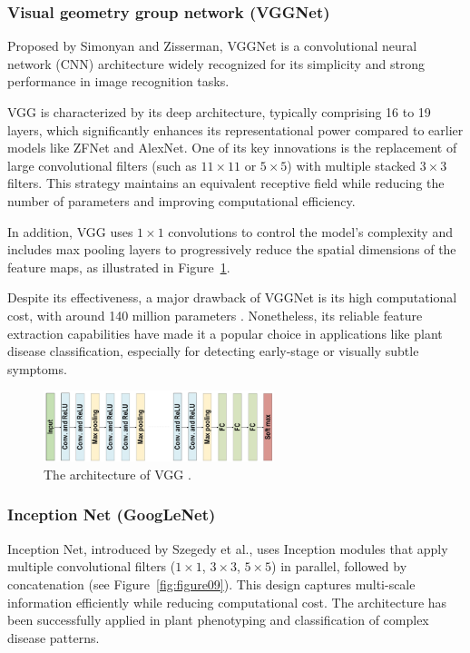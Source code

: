 \subsubsection{Visual geometry group network (VGGNet)}
Proposed by Simonyan and Zisserman, VGGNet is a convolutional neural network (CNN) architecture widely recognized for its simplicity and strong performance in image recognition tasks.

VGG is characterized by its deep architecture, typically comprising 16 to 19 layers, which significantly enhances its representational power compared to earlier models like ZFNet and AlexNet. One of its key innovations is the replacement of large convolutional filters (such as $11 \times 11$ or $5 \times 5$) with multiple stacked $3 \times 3$ filters. This strategy maintains an equivalent receptive field while reducing the number of parameters and improving computational efficiency.

In addition, VGG uses $1 \times 1$ convolutions to control the model’s complexity and includes max pooling layers to progressively reduce the spatial dimensions of the feature maps, as illustrated in Figure~\ref{fig:figure08}.

Despite its effectiveness, a major drawback of VGGNet is its high computational cost, with around 140 million parameters \parencite{alzubaidi2021review}. Nonetheless, its reliable feature extraction capabilities have made it a popular choice in applications like plant disease classification, especially for detecting early-stage or visually subtle symptoms.


\begin{figure}[H] %
    \centering
    \includegraphics[width=0.6\textwidth]{chapters/chapter1/images/Figure08.png}
    \caption{The architecture of VGG \parencite{alzubaidi2021review}.}
    \label{fig:figure08}
\end{figure}

\subsubsection{Inception Net (GoogLeNet)}
Inception Net, introduced by Szegedy et al., uses Inception modules that apply multiple convolutional filters ($1 \times 1$, $3 \times 3$, $5 \times 5$) in parallel, followed by concatenation (see Figure~\ref{fig:figure09}). This design captures multi-scale information efficiently while reducing computational cost. The architecture has been successfully applied in plant phenotyping and classification of complex disease patterns.

